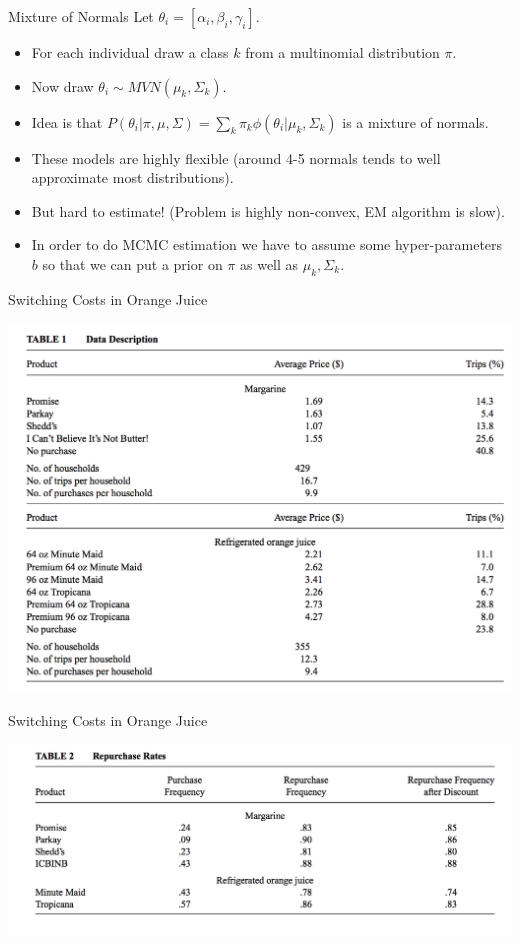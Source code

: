 \documentclass[xcolor=pdftex,dvipsnames,table,mathserif]{beamer}
\begin{document}
\begin{frame}{Mixture of Normals}
Let $\theta_i =[\alpha_i,\beta_i,\gamma_i]$.
\begin{itemize}
\item For each individual draw a class $k$ from a multinomial distribution $\pi$.
\item Now draw $\theta_i \sim MVN(\mu_k, \Sigma_k)$.
\item Idea is that $P(\theta_i | \pi,\mu,\Sigma) = \sum_k \pi_k \phi(\theta_i | \mu_k, \Sigma_k)$ is a mixture of normals. \pause
\item These models are highly flexible (around 4-5 normals tends to well approximate most distributions).
\item But hard to estimate! (Problem is highly non-convex, EM algorithm is slow).
\item In order to do MCMC estimation we have to assume some hyper-parameters $b$ so that we can put a prior on $\pi$ as well as $\mu_k,\Sigma_k$.
\end{itemize}
\end{frame} 



\begin{frame}{Switching Costs in Orange Juice}
\begin{center}
\includegraphics[scale=0.5]{resources/oj_t1.png}
\end{center}
\end{frame}

\begin{frame}{Switching Costs in Orange Juice}
\begin{center}
\includegraphics[scale=0.5]{resources/oj_t2.png}
\end{center}
\end{frame}
\end{document}
